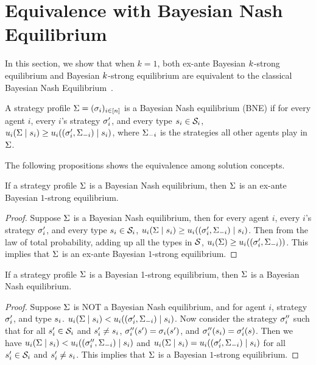 \section{Equivalence with Bayesian Nash Equilibrium}
\label{apx:equiv}

In this section, we show that when $k = 1$, both ex-ante Bayesian $k$-strong equilibrium and Bayesian $k$-strong equilibrium are equivalent to the classical Bayesian Nash Equilibrium~\cite{Harsanyi67}. 

\begin{definition}
    A strategy profile $\Sigma = (\sigma_i)_{i\in [n]}$ is a Bayesian Nash equilibrium (BNE) if for every agent $i$, every $i$'s strategy $\sigma_i'$, and every type $s_i \in \mathcal{S}_i$, $u_i (\Sigma \mid s_i) \ge u_i((\sigma_i', \Sigma_{-i}) \mid s_i)$, where $\Sigma_{-i}$ is the strategies all other agents play in $\Sigma$. 
\end{definition}

The following propositions shows the equivalence among solution concepts. 

\begin{prop}
\label{prop:BNE_to_exante}
    If a strategy profile $\Sigma$ is a Bayesian Nash equilibrium, then $\Sigma$ is an ex-ante Bayesian $1$-strong equilibrium. 
\end{prop}
\begin{proof}
    Suppose $\Sigma$ is a Bayesian Nash equilibrium, then for every agent $i$, every $i$'s strategy $\sigma_i'$, and every type $s_i \in \mathcal{S}_i$, $u_i (\Sigma \mid s_i) \ge u_i((\sigma_i', \Sigma_{-i}) \mid s_i)$. Then from the law of total probability, adding up all the types in $\mathcal{S}$, $u_i(\Sigma) \ge u_i((\sigma_i', \Sigma_{-i}))$. This implies that $\Sigma$ is an ex-ante Bayesian $1$-strong equilibrium. 
\end{proof}

\begin{prop}
\label{prop:qi_to_BNE}
    If a strategy profile $\Sigma$ is a Bayesian 1-strong equilibrium, then $\Sigma$ is a Bayesian Nash equilibrium. 
\end{prop}
\begin{proof}
    Suppose $\Sigma$ is NOT a Bayesian Nash equilibrium, and for agent $i$, strategy $\sigma'_i$, and type $s_i$.  $u_i (\Sigma \mid s_i) < u_i((\sigma_i', \Sigma_{-i}) \mid s_i)$. Now consider the strategy $\sigma_i''$ such that for all $s_i' \in \mathcal{S}_i$ and $s_i' \neq s_i$, $\sigma_i''(s') = \sigma_i(s')$, and $\sigma_i''(s_i) = \sigma_i'(s)$. Then we have $u_i (\Sigma \mid s_i) < u_i((\sigma_i'', \Sigma_{-i}) \mid s_i)$ and $u_i (\Sigma \mid s_i)  = u_i((\sigma_i', \Sigma_{-i}) \mid s_i)$ for all $s_i' \in \mathcal{S}_i$ and $s_i' \neq s_i$.  This implies that $\Sigma$ is a Bayesian $1$-strong equilibrium. 
\end{proof}

